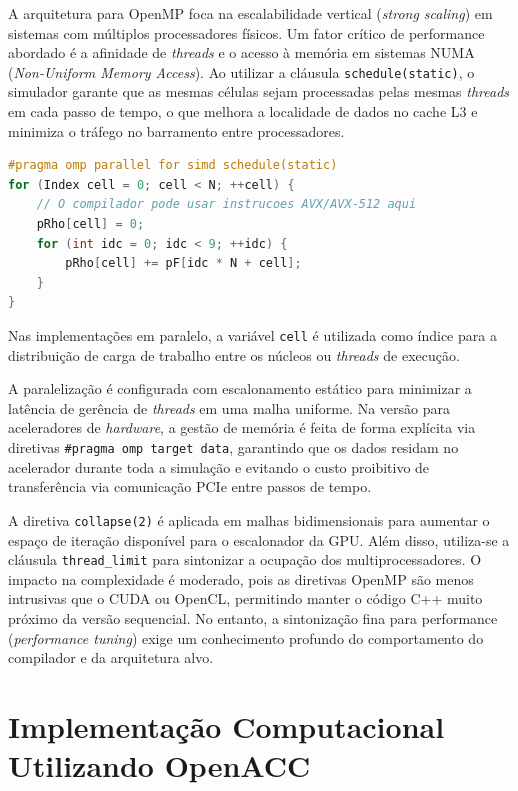 A arquitetura para OpenMP foca na escalabilidade vertical (\textit{strong scaling}) em sistemas com múltiplos processadores físicos.
Um fator crítico de performance abordado é a afinidade de \textit{threads} e o acesso à memória em sistemas NUMA (\textit{Non-Uniform Memory Access}). Ao utilizar a cláusula \texttt{schedule(static)}, o simulador garante que as mesmas células sejam processadas pelas mesmas \textit{threads} em cada passo de tempo, o que melhora a localidade de dados no cache L3 e minimiza o tráfego no barramento entre processadores.
\begin{lstlisting}[language=C++, caption={Uso de SIMD e afinidade no OpenMP.}, label={lst:openmp-simd}, float=ht]
#pragma omp parallel for simd schedule(static)
for (Index cell = 0; cell < N; ++cell) {
    // O compilador pode usar instrucoes AVX/AVX-512 aqui
    pRho[cell] = 0;
    for (int idc = 0; idc < 9; ++idc) {
        pRho[cell] += pF[idc * N + cell];
    }
}
\end{lstlisting}
Nas implementações em paralelo, a variável \texttt{cell} é utilizada como índice para a distribuição de carga de trabalho entre os núcleos ou \textit{threads} de execução.

A paralelização é configurada com escalonamento estático para minimizar a latência de gerência de \textit{threads} em uma malha uniforme.
Na versão para aceleradores de \textit{hardware}, a gestão de memória é feita de forma explícita via diretivas \texttt{\#pragma omp target data}, garantindo que os dados residam no acelerador durante toda a simulação e evitando o custo proibitivo de transferência via comunicação PCIe entre passos de tempo.

A diretiva \texttt{collapse(2)} é aplicada em malhas bidimensionais para aumentar o espaço de iteração disponível para o escalonador da GPU. Além disso, utiliza-se a cláusula \texttt{thread\_limit} para sintonizar a ocupação dos multiprocessadores.
O impacto na complexidade é moderado, pois as diretivas OpenMP são menos intrusivas que o CUDA ou OpenCL, permitindo manter o código C++ muito próximo da versão sequencial.
No entanto, a sintonização fina para performance (\textit{performance tuning}) exige um conhecimento profundo do comportamento do compilador e da arquitetura alvo.


\section{Implementação Computacional Utilizando OpenACC}\label{sec:implementacao-computacional-utilizando-openacc}

